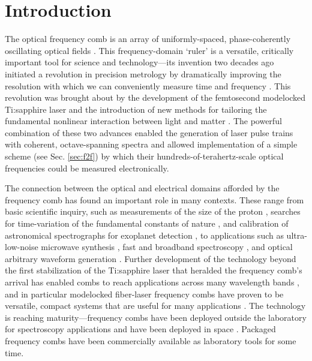  \chapter{Introduction}
\label{chap:introduction}

The optical frequency comb is an array of uniformly-spaced, phase-coherently oscillating optical fields \cite{Hall2006,Hansch2006}. This frequency-domain `ruler' is a versatile, critically important tool for science and technology---its invention two decades ago initiated a revolution in precision metrology by dramatically improving the resolution with which we can conveniently measure time and frequency \cite{Diddams2000,Jones2000,Diddams2001,Udem2002}. This revolution was brought about by the development of the femtosecond modelocked Ti:sapphire laser \cite{Stingl1995} and the introduction of new methods for tailoring the fundamental nonlinear interaction between light and matter \cite{Ranka2000,Dudley2006}. The powerful combination of these two advances enabled the generation of laser pulse trains with coherent, octave-spanning spectra and allowed implementation of a simple scheme (see Sec. \ref{sec:f2f}) by which their hundreds-of-terahertz-scale optical frequencies could be measured electronically.

The connection between the optical and electrical domains afforded by the frequency comb has found an important role in many contexts. These range from basic scientific inquiry, such as measurements of the size of the proton \cite{Beyer2017}, searches for time-variation of the fundamental constants of nature \cite{Lea2007,Blatt2008}, and calibration of astronomical spectrographs for exoplanet detection \cite{Steinmetz2008}, to applications such as ultra-low-noise microwave synthesis \cite{McFerran2005,Fortier2011}, fast and broadband spectroscopy \cite{Diddams2007,Coddington2016}, and optical arbitrary waveform generation \cite{Cundiff2010}. Further development of the technology beyond the first stabilization of the Ti:sapphire laser that heralded the frequency comb's arrival has enabled combs to reach applications across many wavelength bands \cite{Washburn2004a,Gohle2005b,Diddams2010,Faist2016}, and in particular modelocked fiber-laser frequency combs have proven to be versatile, compact systems that are useful for many applications \cite{Newbury2007,Fermann2013,Sinclair2015}. The technology is reaching maturity---frequency combs have been deployed outside the laboratory for spectroscopy applications \cite{Sinclair2014,Coburn2018} and have been deployed in space \cite{Lezius2016}. Packaged frequency combs have been commercially available as laboratory tools for some time.

